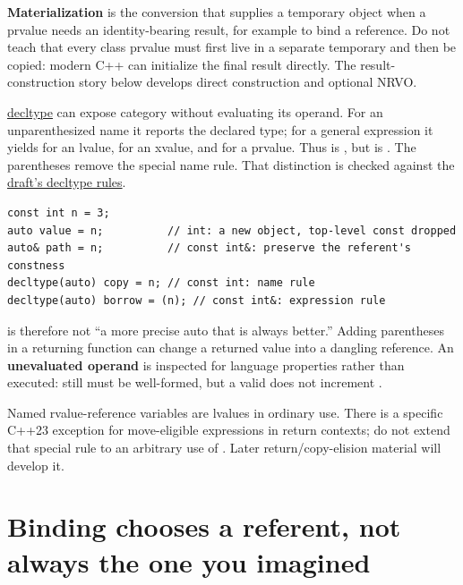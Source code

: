 \textbf{Materialization} is the conversion that supplies a temporary object when a prvalue needs an identity-bearing result, for example to bind a reference. Do not teach that every class prvalue must first live in a separate temporary and then be copied: modern C++ can initialize the final result directly. The result-construction story below develops direct construction and optional NRVO.

\hyperref[appendix-5d4252a42886]{decltype} can expose category without evaluating its operand. For an unparenthesized name it reports the declared type; for a general expression it yields  for an lvalue,  for an xvalue, and  for a prvalue. Thus  is , but  is . The parentheses remove the special name rule. That distinction is checked against the \href{https://eel.is/c++draft/dcl.type.decltype}{draft's decltype rules}.

\begin{verbatim}
const int n = 3;
auto value = n;          // int: a new object, top-level const dropped
auto& path = n;          // const int&: preserve the referent's constness
decltype(auto) copy = n; // const int: name rule
decltype(auto) borrow = (n); // const int&: expression rule
\end{verbatim}

 is therefore not ``a more precise auto that is always better.'' Adding parentheses in a returning function can change a returned value into a dangling reference. An \textbf{unevaluated operand} is inspected for language properties rather than executed:  still must be well-formed, but a valid  does not increment .

Named rvalue-reference variables are lvalues in ordinary use. There is a specific C++23 exception for move-eligible expressions in return contexts; do not extend that special rule to an arbitrary use of . Later return/copy-elision material will develop it.

\section{Binding chooses a referent, not always the one you imagined}\label{01-foundations-i-ch003-binding-chooses-a-referent-not-always-the-one-you-imagined}

